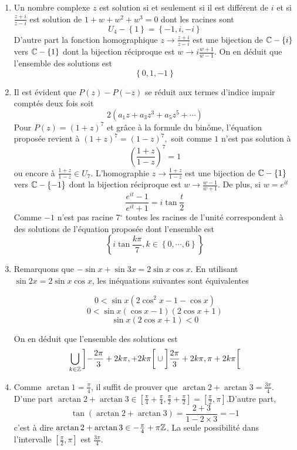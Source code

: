 

\begin{enumerate}
\item Un nombre complexe $z$ est solution si et seulement si il est diff{\'e}rent de $i$ et si $\frac{z+i}{z-i}$ est solution de $1+w+w^{2}+w^{3}=0$ dont les racines sont 
\begin{displaymath}
 U_{4}-\left\{ 1\right\}=\left\{ -1,i,-i\right\}
\end{displaymath}
D'autre part la fonction homographique $z\rightarrow \frac{z+i}{z-i}$ est une bijection de $\mathbb{C}-\left\{ i\right\}$ vers $\mathbb{C}-\left\{1\right\}$ dont la bijection r{\'e}ciproque est $w\rightarrow i\frac{w+1}{w-1}$. On en d{\'e}duit que l'ensemble des solutions est
\[
\left\{ 0,1,-1\right\}
\]

\item Il est {\'e}vident que $P(z)-P(-z)$ se r{\'e}duit
aux termes d'indice impair compt{\'e}s deux fois soit
\[
2(a_{1}z+a_{3}z^{3}+a_{5}z^{5}+\cdots )
\]
Pour $P(z)=(1+z)^{7}$ et gr{\^a}ce {\`a} la formule du bin{\^o}me,
l'{\'e}quation propos{\'e}e revient {\`a} $(1+z)^{7}=(1-z)^{7},$ soit comme $1$ n'est pas solution {\`a}
\[
\left( \frac{1+z}{1-z}\right) ^{7}=1
\]
ou encore {\`a} $\frac{1+z}{1-z}\in U_{7}$. L'homographie $z\rightarrow \frac{1+z}{1-z}$ est une bijection de $\mathbb{C}-\left\{ 1\right\}$ vers $\mathbb{C}-\left\{ -1\right\}$ dont la bijection r{\'e}ciproque est $w\rightarrow \frac{w-1}{w+1}$. De plus, si $w=e^{it}$
\[
\frac{e^{it}-1}{e^{it}+1}=i\tan \frac{t}{2}
\]
Comme $-1$ n'est pas racine 7${{}^\circ}$ toutes les racines de l'unit{\'e}
correspondent {\`a} des solutions de l'{\'e}quation propos{\'e}e dont
l'ensemble est
\[
\left\{ i\tan \frac{k\pi }{7},k\in \left\{ 0,\cdots ,6\right\} \right\}
\]

\item  Remarquons que $-\sin x+\sin 3x=2\sin x\cos x$.
\newline
 En utilisant $\sin 2x=2\sin x\cos x$, les in{\'e}quations suivantes sont {\'e}quivalentes

\[0<\sin x(2\cos ^{2}x-1-\cos x)\]
\[0< \sin x(\cos x-1)(2\cos x+1)\]
\[ \sin x(2\cos x+1)<0\]

On en d{\'e}duit  que l'ensemble des solutions est
\[
\bigcup_{k\in \mathbb{Z}}\left] -\frac{2\pi }{3}+2k\pi ,+2k\pi
\right[ \cup \left] \frac{2\pi }{3}+2k\pi ,\pi +2k\pi \right[
\]

\item Comme $\arctan 1=\frac{\pi }{4}$, il suffit de
prouver que $\arctan 2+\arctan 3=\frac{3\pi }{4}$.\newline
D'une part
$\arctan 2+\arctan 3\in \left[ \frac{\pi }{4}+\frac{\pi
}{4},\frac{\pi }{2}+\frac{\pi }{2}\right] =\left[ \frac{\pi
}{2},\pi \right] $.\newline D'autre part,
\[
\tan (\arctan 2+\arctan 3)=\frac{2+3}{1-2\times 3}=-1
\]
c'est {\`a} dire $\arctan 2+\arctan 3\in -\frac{\pi }{4}+\pi
\mathbb{Z}$. La seule possibilit{\'e} dans l'intervalle $\left[
\frac{\pi }{2},\pi \right] $ est $\frac{3\pi }{4}$.


\end{enumerate}
